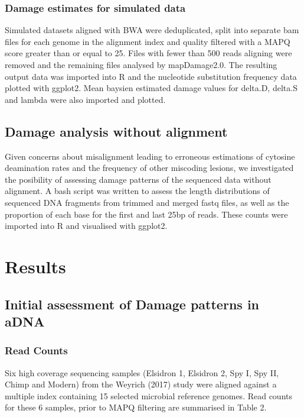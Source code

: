 \documentclass[12pt, a4paper]{article}
\begin{document}
\subsubsection{Damage estimates for simulated data}
Simulated datasets aligned with BWA were deduplicated, split into separate bam files for each genome in the alignment index and quality filtered with a MAPQ score greater than or equal to 25. Files with fewer than 500 reads aligning were removed and the remaining files analysed by mapDamage2.0. The resulting output data was imported into R and the nucleotide substitution frequency data plotted with ggplot2. Mean baysien estimated damage values for delta.D, delta.S and lambda were also imported and plotted.


\subsection{Damage analysis without alignment}
Given concerns about misalignment leading to erroneous estimations of cytosine deamination rates and the frequency of other miscoding lesions, we investigated the posibility of assessing damage patterns of the sequenced data without alignment. A bash script was written to assess the length distributions of sequenced DNA fragments from trimmed and merged fastq files, as well as the proportion of each base for the first and last 25bp of reads. These counts were imported into R and visualised with ggplot2.


\clearpage
\section{Results}\label{sec:results}

\subsection{Initial assessment of Damage patterns in aDNA}

\subsubsection{Read Counts}\label{sssec:readCounts}
Six high coverage sequencing samples (Elsidron 1, Elsidron 2, Spy I, Spy II, Chimp and Modern) from the Weyrich (2017) study were aligned against a multiple index containing 15 selected microbial reference genomes. Read counts for these 6 samples, prior to MAPQ filtering are summarised in Table 2.
\\
\end{document}
